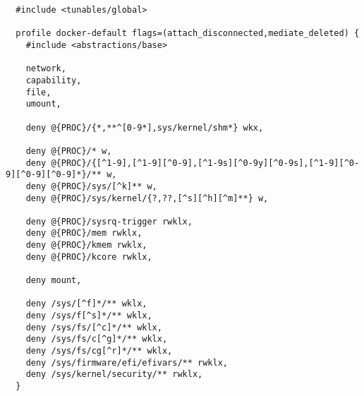 

\begin{lstlisting}
  #include <tunables/global>

  profile docker-default flags=(attach_disconnected,mediate_deleted) {
    #include <abstractions/base>

    network,
    capability,
    file,
    umount,

    deny @{PROC}/{*,**^[0-9*],sys/kernel/shm*} wkx,

    deny @{PROC}/* w,
    deny @{PROC}/{[^1-9],[^1-9][^0-9],[^1-9s][^0-9y][^0-9s],[^1-9][^0-9][^0-9][^0-9]*}/** w,
    deny @{PROC}/sys/[^k]** w,
    deny @{PROC}/sys/kernel/{?,??,[^s][^h][^m]**} w,

    deny @{PROC}/sysrq-trigger rwklx,
    deny @{PROC}/mem rwklx,
    deny @{PROC}/kmem rwklx,
    deny @{PROC}/kcore rwklx,

    deny mount,

    deny /sys/[^f]*/** wklx,
    deny /sys/f[^s]*/** wklx,
    deny /sys/fs/[^c]*/** wklx,
    deny /sys/fs/c[^g]*/** wklx,
    deny /sys/fs/cg[^r]*/** wklx,
    deny /sys/firmware/efi/efivars/** rwklx,
    deny /sys/kernel/security/** rwklx,
  }
\end{lstlisting}
